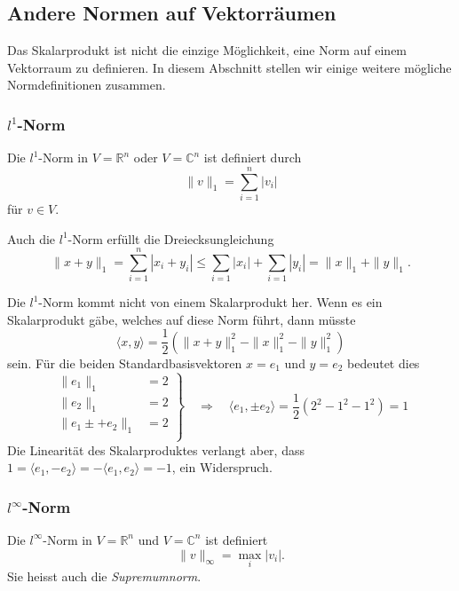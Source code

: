 \subsection{Andere Normen auf Vektorräumen
\label{buch:subsection:andere-normen}}
Das Skalarprodukt ist nicht die einzige Möglichkeit, eine Norm auf einem
Vektorraum zu definieren.
In diesem Abschnitt stellen wir einige weitere mögliche Normdefinitionen
zusammen.

\subsubsection{$l^1$-Norm}
\begin{definition}
Die $l^1$-Norm in $V=\mathbb{R}^n$ oder $V=\mathbb{C}^n$ ist definiert durch
%
\[
\| v\|_1
=
\sum_{i=1}^n |v_i|
\]
für $v\in V$.
\end{definition}

Auch die $l^1$-Norm erfüllt die Dreiecksungleichung
\[
\|x+y\|_1
=
\sum_{i=1}^n |x_i+y_i|
\le 
\sum_{i=1} |x_i| + \sum_{i=1} |y_i|
=
\|x\|_1 + \|y\|_1.
\]

Die $l^1$-Norm kommt nicht von einem Skalarprodukt her.
Wenn es ein Skalarprodukt gäbe, welches auf diese Norm führt, dann
müsste 
\[
\langle x,y\rangle
=
\frac12(\|x+y\|_1^2-\|x\|_1^2-\|y\|_1^2)
\]
sein.
Für die beiden Standardbasisvektoren $x=e_1$ und $y=e_2$ 
bedeutet dies
\[
\left .
\begin{aligned}
\|e_1\|_1 &= 2\\
\|e_2\|_1 &= 2\\
\|e_1\pm +e_2\|_1 &= 2\\
\end{aligned}
\right\}
\quad\Rightarrow\quad
\langle e_1,\pm e_2\rangle
=
\frac12( 2^2 - 1^2 - 1^2) 
=1
\]
Die Linearität des Skalarproduktes verlangt aber, dass
$1=\langle e_1,-e_2\rangle = -\langle e_1,e_2\rangle = -1$,
ein Widerspruch.

\subsubsection{$l^\infty$-Norm}

\begin{definition}
Die $l^\infty$-Norm in $V=\mathbb{R}^n$ und $V=\mathbb{C}^n$ ist definiert
\[
\|v\|_\infty
=
\max_{i} |v_i|.
\]
Sie heisst auch die {\em Supremumnorm}.
%
%
\end{definition}

